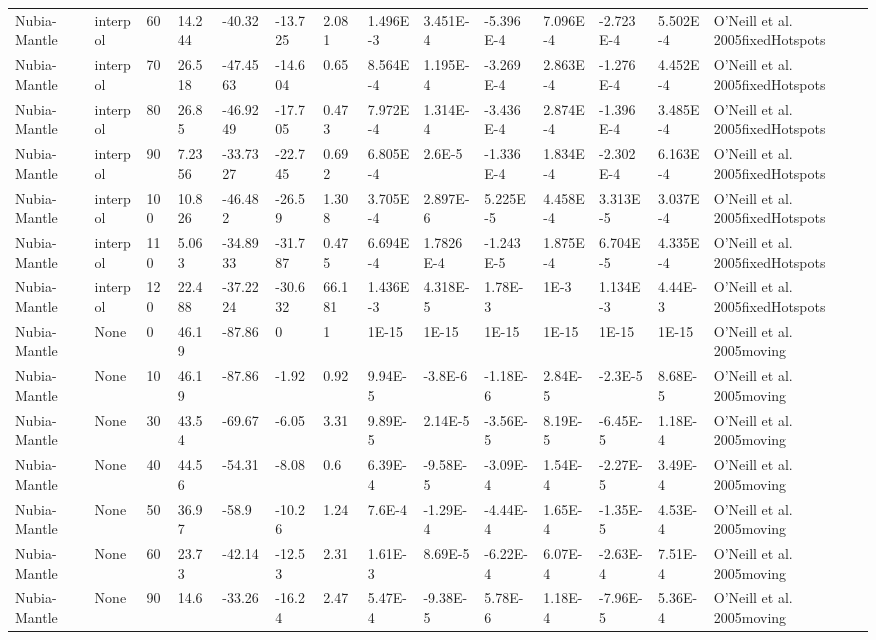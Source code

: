 \begin{landscape}
\begin{longtable}{@{}lllllllllllllp{3.5cm}@{}}
Nubia-Mantle & interpol & 60 & 14.244 & -40.32 & -13.725 & 2.081 & 1.496E-3 & 3.451E-4 & -5.396E-4 & 7.096E-4 & -2.723E-4 & 5.502E-4 & O'Neill et al. 2005fixedHotspots \\
Nubia-Mantle & interpol & 70 & 26.518 & -47.4563 & -14.604 & 0.65 & 8.564E-4 & 1.195E-4 & -3.269E-4 & 2.863E-4 & -1.276E-4 & 4.452E-4 & O'Neill et al. 2005fixedHotspots \\
Nubia-Mantle & interpol & 80 & 26.85 & -46.9249 & -17.705 & 0.473 & 7.972E-4 & 1.314E-4 & -3.436E-4 & 2.874E-4 & -1.396E-4 & 3.485E-4 & O'Neill et al. 2005fixedHotspots \\
Nubia-Mantle & interpol & 90 & 7.2356 & -33.7327 & -22.745 & 0.692 & 6.805E-4 & 2.6E-5 & -1.336E-4 & 1.834E-4 & -2.302E-4 & 6.163E-4 & O'Neill et al. 2005fixedHotspots \\
Nubia-Mantle & interpol & 100 & 10.826 & -46.482 & -26.59 & 1.308 & 3.705E-4 & 2.897E-6 & 5.225E-5 & 4.458E-4 & 3.313E-5 & 3.037E-4 & O'Neill et al. 2005fixedHotspots \\
Nubia-Mantle & interpol & 110 & 5.063 & -34.8933 & -31.787 & 0.475 & 6.694E-4 & 1.7826E-4 & -1.243E-5 & 1.875E-4 & 6.704E-5 & 4.335E-4 & O'Neill et al. 2005fixedHotspots \\
Nubia-Mantle & interpol & 120 & 22.488 & -37.2224 & -30.632 & 66.181 & 1.436E-3 & 4.318E-5 & 1.78E-3 & 1E-3 & 1.134E-3 & 4.44E-3 & O'Neill et al. 2005fixedHotspots \\
Nubia-Mantle & None & 0 & 46.19 & -87.86 & 0 & 1 & 1E-15 & 1E-15 & 1E-15 & 1E-15 & 1E-15 & 1E-15 & O'Neill et al. 2005moving \\
Nubia-Mantle & None & 10 & 46.19 & -87.86 & -1.92 & 0.92 & 9.94E-5 & -3.8E-6 & -1.18E-6 & 2.84E-5 & -2.3E-5 & 8.68E-5 & O'Neill et al. 2005moving \\
Nubia-Mantle & None & 30 & 43.54 & -69.67 & -6.05 & 3.31 & 9.89E-5 & 2.14E-5 & -3.56E-5 & 8.19E-5 & -6.45E-5 & 1.18E-4 & O'Neill et al. 2005moving \\
Nubia-Mantle & None & 40 & 44.56 & -54.31 & -8.08 & 0.6 & 6.39E-4 & -9.58E-5 & -3.09E-4 & 1.54E-4 & -2.27E-5 & 3.49E-4 & O'Neill et al. 2005moving \\
Nubia-Mantle & None & 50 & 36.97 & -58.9 & -10.26 & 1.24 & 7.6E-4 & -1.29E-4 & -4.44E-4 & 1.65E-4 & -1.35E-5 & 4.53E-4 & O'Neill et al. 2005moving \\
Nubia-Mantle & None & 60 & 23.73 & -42.14 & -12.53 & 2.31 & 1.61E-3 & 8.69E-5 & -6.22E-4 & 6.07E-4 & -2.63E-4 & 7.51E-4 & O'Neill et al. 2005moving \\
Nubia-Mantle & None & 90 & 14.6 & -33.26 & -16.24 & 2.47 & 5.47E-4 & -9.38E-5 & 5.78E-6 & 1.18E-4 & -7.96E-5 & 5.36E-4 & O'Neill et al. 2005moving \\

\end{longtable}
\end{landscape}
